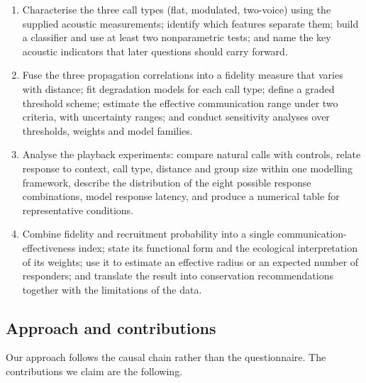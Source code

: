 \begin{enumerate}[leftmargin=1.6em,itemsep=2pt]
  \item Characterise the three call types (flat, modulated, two-voice) using the supplied
        acoustic measurements; identify which features separate them; build a classifier and
        use at least two nonparametric tests; and name the key acoustic indicators that later
        questions should carry forward.
  \item Fuse the three propagation correlations into a fidelity measure that varies with
        distance; fit degradation models for each call type; define a graded threshold scheme;
        estimate the effective communication range under two criteria, with uncertainty ranges;
        and conduct sensitivity analyses over thresholds, weights and model families.
  \item Analyse the playback experiments: compare natural calls with controls, relate response
        to context, call type, distance and group size within one modelling framework,
        describe the distribution of the eight possible response combinations, model response
        latency, and produce a numerical table for representative conditions.
  \item Combine fidelity and recruitment probability into a single communication-effectiveness
        index; state its functional form and the ecological interpretation of its weights; use
        it to estimate an effective radius or an expected number of responders; and translate
        the result into conservation recommendations together with the limitations of the data.
\end{enumerate}

\subsection{Approach and contributions}

Our approach follows the causal chain rather than the questionnaire. The contributions we claim
are the following.

